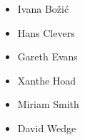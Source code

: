 \documentclass{beamer}
\begin{document}
\begin{frame}
\begin{columns}
\begin{column}{0.5\textwidth}
        \begin{itemize}
            \item Ivana Bo\v{z}i\'{c}
            \item Hans Clevers
            \item Gareth Evans
            \item Xanthe Hoad
            \item Miriam Smith
            \item David Wedge
        \end{itemize}

        \end{column}
    \end{columns}
\end{frame}
\end{document}
